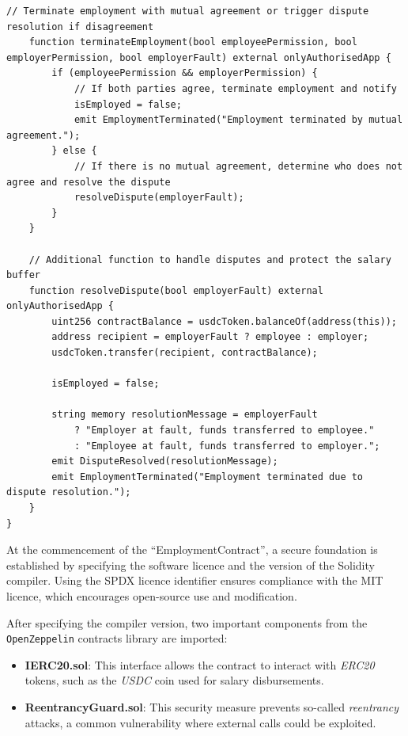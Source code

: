 \begin{lstlisting}[caption=General Purpose Smart Contract]
    // Terminate employment with mutual agreement or trigger dispute resolution if disagreement
    function terminateEmployment(bool employeePermission, bool employerPermission, bool employerFault) external onlyAuthorisedApp {
        if (employeePermission && employerPermission) {
            // If both parties agree, terminate employment and notify
            isEmployed = false;
            emit EmploymentTerminated("Employment terminated by mutual agreement.");
        } else {
            // If there is no mutual agreement, determine who does not agree and resolve the dispute
            resolveDispute(employerFault);
        }
    }

    // Additional function to handle disputes and protect the salary buffer
    function resolveDispute(bool employerFault) external onlyAuthorisedApp {
        uint256 contractBalance = usdcToken.balanceOf(address(this));
        address recipient = employerFault ? employee : employer;
        usdcToken.transfer(recipient, contractBalance);

        isEmployed = false;

        string memory resolutionMessage = employerFault 
            ? "Employer at fault, funds transferred to employee." 
            : "Employee at fault, funds transferred to employer.";
        emit DisputeResolved(resolutionMessage);
        emit EmploymentTerminated("Employment terminated due to dispute resolution.");
    }
}
\end{lstlisting}

At the commencement of the ``EmploymentContract'', a secure foundation is established by specifying the software licence and the version of the Solidity compiler. Using the SPDX licence identifier ensures compliance with the MIT licence, which encourages open-source use and modification.

After specifying the compiler version, two important components from the \texttt{OpenZeppelin}  contracts library are imported:
\begin{itemize}
    \item \textbf{IERC20.sol}: This interface allows the contract to interact with \textit{ERC20} tokens, such as the \textit{USDC} coin used for salary disbursements.
    \item \textbf{ReentrancyGuard.sol}: This security measure prevents so-called \textit{reentrancy} attacks, a common vulnerability where external calls could be exploited.
\end{itemize}

